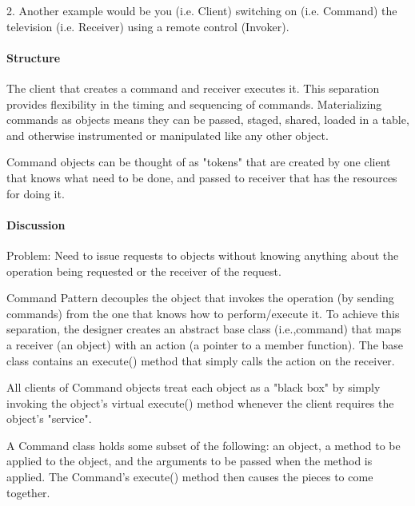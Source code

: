 \documentclass{book}
\begin{document}
2. Another example would be you (i.e. Client) switching on (i.e. Command) the television (i.e. Receiver) using a remote control (Invoker).
\paragraph{Structure}
The client that creates a command and receiver executes it. This separation provides flexibility in the timing and sequencing of commands.
Materializing commands as objects means they can be passed, staged, shared, loaded in a table, and otherwise instrumented or manipulated like any other object.

\begin{figure}[H]
\begin{floatrow}
\end{floatrow}
\end{figure}

Command objects can be thought of as "tokens" that are created by one client that knows what need to be done, and passed to receiver that has the resources for doing it.
\paragraph{Discussion}
Problem: Need to issue requests to objects without knowing anything about the operation being requested or the receiver of the request.

Command Pattern decouples the object that invokes the operation (by sending commands) from the one that knows how to perform/execute it.
To achieve this separation, the designer creates an abstract base class (i.e.,command) that maps a receiver (an object) with an action (a pointer to a member function).
The base class contains an execute() method that simply calls the action on the receiver.

All clients of Command objects treat each object as a "black box" by simply invoking the object's virtual execute() method whenever the client requires the object's "service".

A Command class holds some subset of the following: an object, a method to be applied to the object, and the arguments to be passed when the method is applied.
The Command's execute() method then causes the pieces to come together.
\end{document}
